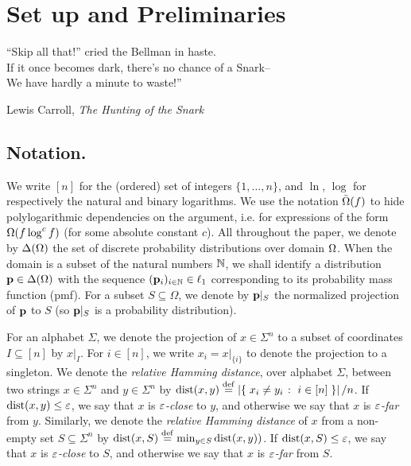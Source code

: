 \chapter{Set up and Preliminaries}

\epigraph{``Skip all that!'' cried the Bellman in haste.\\
If it once becomes dark, there's no chance of a Snark--\\
We have hardly a minute to waste!''}{Lewis Carroll, \textit{The Hunting of the Snark}}

\section{Notation.} We write $[n]$ for the (ordered) set of integers $\{1,\dots,n\}$, and $\ln$, $\log$ for respectively the natural and binary logarithms. We use the notation $\tildeOmega{f}$ to hide polylogarithmic dependencies on the argument, i.e. for expressions of the form $\bigOmega{f \log^c f}$ (for some absolute constant $c$). All throughout the paper, we denote by $\distribs{\domain[\Omega]}$ the set of discrete probability distributions over domain $\domain[\Omega]$. When the domain is a subset of the natural numbers $\N$, we shall identify a distribution $\p\in\distribs{\domain[\Omega]}$ with the sequence $(\p_i)_{i\in\N}\in\lp[1]$ corresponding to its probability mass function (pmf). For a subset $S \subseteq \Omega$, we denote by $\p|_S$ the normalized projection of $\p$ to $S$ (so $\p|_S$ is a probability distribution).

For an alphabet $\Sigma$, we denote the projection of $x \in \Sigma^n$ to a subset of
  coordinates $I \subseteq [n]$ by $x|_I$. For $i \in [n]$, we write
  $x_i = x|_{\{i\}}$ to denote the projection to a singleton. We denote the \emph{relative Hamming distance}, over alphabet
  $\Sigma$, between two strings $x \in \Sigma^n$ and $y \in \Sigma^n$ by
  $\dist{x}{y} \eqdef \abs{ \setOfSuchThat{ x_i \neq y_i }{ i \in [n] } }/n$.
  If $\dist{x}{y} \leq \eps$, we say that $x$ is \emph{$\eps$-close}
  to $y$, and otherwise we say that $x$ is \emph{$\eps$-far} from
  $y$. Similarly, we denote the \emph{relative Hamming distance} of $x$ from
  a non-empty set $S \subseteq \Sigma^n$ by
  $\dist{x}{S} \eqdef \min_{y \in S} \dist{x}{y})$. If
  $\dist{x}{S} \leq \eps$, we say that $x$ is \emph{$\eps$-close} to
  $S$, and otherwise we say that $x$ is \emph{$\eps$-far} from $S$.

